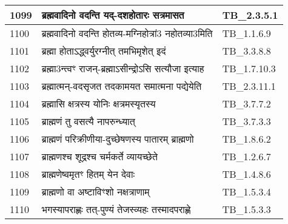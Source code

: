 \documentclass[17pt]{extarticle}
\begin{document}
\begin{longtable}{||p{0.4in}||p{4.9in}||p{0.9in}||}
    1099 & ब्रह्मवादिनो वदन्ति यद्{-}दशहोतारः सत्रमासत & TB\_2.3.5.1       \\
    
    \hline
        
    1100 & ब्रह्मवादिनो वदन्ति होतव्य{-}मग्निहोत्रां3 नहोतव्या3मिति & TB\_1.1.6.9       \\
    
    \hline
        
    1101 & ब्रह्मा होताऽद्ध्वर्युरग्नीत् तमभिमृशेत् इदं & TB\_3.3.8.8       \\
    
    \hline
        
    1102 & ब्रह्मा3न्त्वꣳ राजन्{-}ब्रह्माऽसीन्द्रोऽसि सत्यौजा इत्याह & TB\_1.7.10.3       \\
    
    \hline
        
    1103 & ब्रह्मात्मन्{-}वदसृजत तदकामयत समात्मना पद्येयेति & TB\_2.3.11.1       \\
    
    \hline
        
    1104 & ब्रह्मासि क्षत्रस्य योनिः क्षत्रमस्यृतस्य & TB\_3.7.7.2       \\
    
    \hline
        
    1105 & ब्राह्मणं तु वसत्यै नापरुन्ध्यात् & TB\_3.7.3.3       \\
    
    \hline
        
    1106 & ब्राह्मणं परिक्रीणीया{-}दुच्छेषणस्य पातारम् ब्राह्मणो & TB\_1.8.6.2       \\
    
    \hline
        
    1107 & ब्राह्मणश्च शूद्रश्च चर्मकर्ते व्यायच्छेते & TB\_1.2.6.7       \\
    
    \hline
        
    1108 & ब्राह्मणेष्वमृतꣳ हितम् येन देवाः & TB\_1.4.8.6       \\
    
    \hline
        
    1109 & ब्राह्मणो वा अष्टाविꣳशो नक्षत्राणाम् & TB\_1.5.3.4       \\
    
    \hline
        
    1110 & भगस्यापराह्णः तत्{-}पुण्यं तेजस्व्यहः तस्मादपराह्णे & TB\_1.5.3.3       \\
    

\end{longtable}
\end{document}
